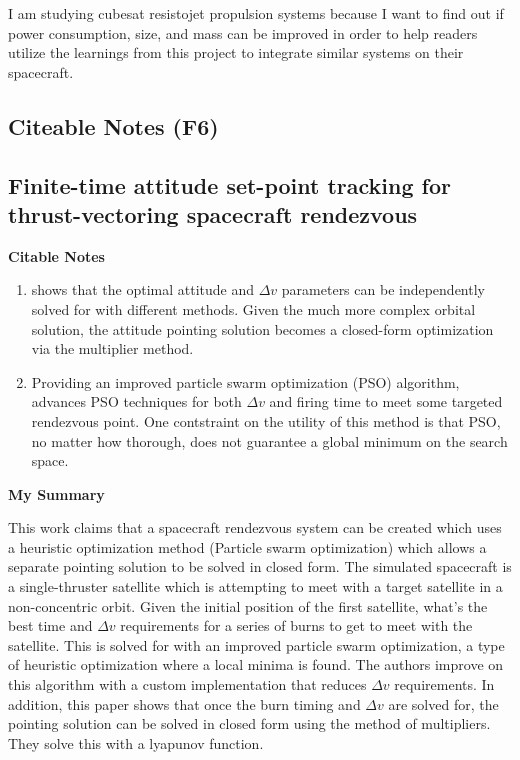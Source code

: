 I am studying cubesat resistojet propulsion systems because I want to find out if power consumption, size, and mass can be improved in order to help readers utilize the learnings from this project to integrate similar systems on their spacecraft.

\subsection{Citeable Notes (F6)}

\subsection{Finite-time attitude set-point tracking for thrust-vectoring spacecraft rendezvous}

\textbf{Citable Notes} 

\begin{enumerate}
    \item \cite{zhangFinitetimeAttitudeSetpoint2020} shows that the optimal attitude and $\Delta v$ parameters can be independently solved for with different methods. Given the much more complex orbital solution, the attitude pointing solution becomes a closed-form optimization via the multiplier method. 
    \item Providing an improved particle swarm optimization (PSO) algorithm, \cite{zhangFinitetimeAttitudeSetpoint2020} advances PSO techniques for both $\Delta v$ and firing time to meet some targeted rendezvous point. One contstraint on the utility of this method is that PSO, no matter how thorough, does not guarantee a global minimum on the search space.
\end{enumerate} 

\textbf{My Summary}

This work claims that a spacecraft rendezvous system can be created which uses a heuristic optimization method (Particle swarm optimization) which allows a separate pointing solution to be solved in closed form. The simulated spacecraft is a single-thruster satellite which is attempting to meet with a target satellite in a non-concentric orbit. Given the initial position of the first satellite, what's the best time and $\Delta v$ requirements for a series of burns to get to meet with the satellite. This is solved for with an improved particle swarm optimization, a type of heuristic optimization where a local minima is found. The authors improve on this algorithm with a custom implementation that reduces $\Delta v$ requirements. In addition, this paper shows that once the burn timing and $\Delta v$ are solved for, the pointing solution can be solved in closed form using the method of multipliers. They solve this with a lyapunov function.

